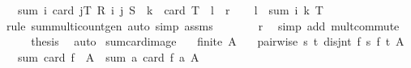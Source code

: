\begin{isabellebody}
\ \ \ {\isachardoublequoteopen}sum\ {\isacharparenleft}{\kern0pt}{\isasymlambda}i{\isachardot}{\kern0pt}\ card\ {\isacharbraceleft}{\kern0pt}j{\isasymin}T{\isachardot}{\kern0pt}\ R\ i\ j{\isacharbraceright}{\kern0pt}{\isacharparenright}{\kern0pt}\ S\ {\isacharequal}{\kern0pt}\ k\ {\isacharasterisk}{\kern0pt}\ card\ T{\isachardoublequoteclose}\ {\isacharparenleft}{\kern0pt}\ {\isachardoublequoteopen}{\isacharquery}{\kern0pt}l\ {\isacharequal}{\kern0pt}\ {\isacharquery}{\kern0pt}r{\isachardoublequoteclose}{\isacharparenright}{\kern0pt}\isanewline
%
\isadelimproof
%
\endisadelimproof
%
\isatagproof
{}\isamarkupfalse%
{\isacharminus}{\kern0pt}\isanewline
\ \ \isamarkupfalse%
\ {\isachardoublequoteopen}{\isacharquery}{\kern0pt}l\ {\isacharequal}{\kern0pt}\ sum\ {\isacharparenleft}{\kern0pt}{\isasymlambda}i{\isachardot}{\kern0pt}\ k{\isacharparenright}{\kern0pt}\ T{\isachardoublequoteclose}\isanewline
\ \ \ \ \isamarkupfalse%
\ {\isacharparenleft}{\kern0pt}rule\ sum{\isacharunderscore}{\kern0pt}multicount{\isacharunderscore}{\kern0pt}gen{\isacharparenright}{\kern0pt}\ {\isacharparenleft}{\kern0pt}auto\ simp{\isacharcolon}{\kern0pt}\ assms{\isacharparenright}{\kern0pt}\isanewline
\ \ \isamarkupfalse%
\ \isamarkupfalse%
\ {\isachardoublequoteopen}{\isasymdots}\ {\isacharequal}{\kern0pt}\ {\isacharquery}{\kern0pt}r{\isachardoublequoteclose}\ \isamarkupfalse%
\ {\isacharparenleft}{\kern0pt}simp\ add{\isacharcolon}{\kern0pt}\ mult{\isachardot}{\kern0pt}commute{\isacharparenright}{\kern0pt}\isanewline
\ \ \isamarkupfalse%
\ \isamarkupfalse%
\ {\isacharquery}{\kern0pt}thesis\ \isamarkupfalse%
\ auto\isanewline
{}\isamarkupfalse%
%
\endisatagproof
{\isafoldproof}%
%
\isadelimproof
\isanewline
%
\endisadelimproof
\isanewline
{}\isamarkupfalse%
\ sum{\isacharunderscore}{\kern0pt}card{\isacharunderscore}{\kern0pt}image{\isacharcolon}{\kern0pt}\isanewline
\ \ \ {\isachardoublequoteopen}finite\ A{\isachardoublequoteclose}\isanewline
\ \ \ {\isachardoublequoteopen}pairwise\ {\isacharparenleft}{\kern0pt}{\isasymlambda}s\ t{\isachardot}{\kern0pt}\ disjnt\ {\isacharparenleft}{\kern0pt}f\ s{\isacharparenright}{\kern0pt}\ {\isacharparenleft}{\kern0pt}f\ t{\isacharparenright}{\kern0pt}{\isacharparenright}{\kern0pt}\ A{\isachardoublequoteclose}\isanewline
\ \ \ {\isachardoublequoteopen}sum\ card\ {\isacharparenleft}{\kern0pt}f\ {\isacharbackquote}{\kern0pt}\ A{\isacharparenright}{\kern0pt}\ {\isacharequal}{\kern0pt}\ sum\ {\isacharparenleft}{\kern0pt}{\isasymlambda}a{\isachardot}{\kern0pt}\ card\ {\isacharparenleft}{\kern0pt}f\ a{\isacharparenright}{\kern0pt}{\isacharparenright}{\kern0pt}\ A{\isachardoublequoteclose}\isanewline

\end{isabellebody}
